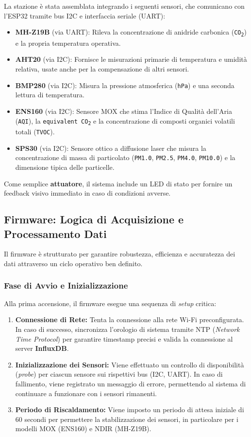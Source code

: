 \documentclass[fleqn,10pt]{SelfArx} %
\begin{document}
La stazione è stata assemblata integrando i seguenti sensori, che comunicano con l’ESP32 tramite bus I2C e interfaccia seriale (UART):
\begin{itemize}
	\item \textbf{MH-Z19B} (via UART): Rileva la concentrazione di anidride carbonica (\texttt{CO\textsubscript{2}}) e la propria temperatura operativa.
	\item \textbf{AHT20} (via I2C): Fornisce le misurazioni primarie di temperatura e umidità relativa, usate anche per la compensazione di altri sensori.
	\item \textbf{BMP280} (via I2C): Misura la pressione atmosferica (\texttt{hPa}) e una seconda lettura di temperatura.
	\item \textbf{ENS160} (via I2C): Sensore MOX che stima l'Indice di Qualità dell’Aria (\texttt{AQI}), la \texttt{equivalent CO\textsubscript{2}} e la concentrazione di composti organici volatili totali (\texttt{TVOC}).
	\item \textbf{SPS30} (via I2C): Sensore ottico a diffusione laser che misura la concentrazione di massa di particolato (\texttt{PM1.0}, \texttt{PM2.5}, \texttt{PM4.0}, \texttt{PM10.0}) e la dimensione tipica delle particelle.
\end{itemize}

Come semplice \textbf{attuatore}, il sistema include un LED di stato per fornire un feedback visivo immediato in caso di condizioni avverse.

\subsection{Firmware: Logica di Acquisizione e Processamento Dati}

Il firmware è strutturato per garantire robustezza, efficienza e accuratezza dei dati attraverso un ciclo operativo ben definito.

\subsubsection{Fase di Avvio e Inizializzazione}
Alla prima accensione, il firmware esegue una sequenza di \textit{setup} critica:
\begin{enumerate}
	\item \textbf{Connessione di Rete:} Tenta la connessione alla rete Wi-Fi preconfigurata. In caso di successo, sincronizza l'orologio di sistema tramite NTP (\textit{Network Time Protocol}) per garantire timestamp precisi e valida la connessione al server \textbf{InfluxDB}.
	\item \textbf{Inizializzazione dei Sensori:} Viene effettuato un controllo di disponibilità (\textit{probe}) per ciascun sensore sui rispettivi bus (I2C, UART). In caso di fallimento, viene registrato un messaggio di errore, permettendo al sistema di continuare a funzionare con i sensori rimanenti.
	\item \textbf{Periodo di Riscaldamento:} Viene imposto un periodo di attesa iniziale di 60 secondi per permettere la stabilizzazione dei sensori, in particolare per i modelli MOX (ENS160) e NDIR (MH-Z19B).
\end{enumerate}
\end{document}
